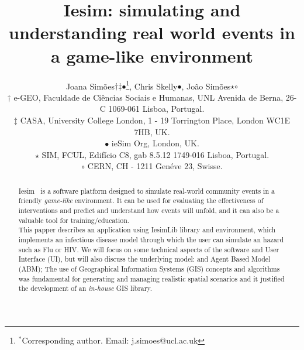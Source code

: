 \documentclass[printer]{tGIS2e}
\begin{document}

\title{Iesim: simulating and understanding real world events in a game-like environment}

\author{Joana Sim\~{o}es${\dag}$${\ddag}$${\bullet}$\thanks{$^\ast$Corresponding author. Email: j.simoes@ucl.ac.uk
\vspace{6pt}}, Chris Skelly${\bullet}$, Jo\~{a}o Sim\~{o}es${\star}$${\circ}$\\\vspace{6pt}  $\dag$ e-GEO, Faculdade de Ci\^{e}ncias Sociais e Humanas, UNL
Avenida de Berna, 26-C
1069-061 Lisboa,
Portugal.\\
$\ddag$ CASA,
 University College London,
 1 - 19 Torrington Place,
 London
 WC1E 7HB, UK.\\
$\bullet$ ieSim Org, London, UK.\\
$\star$ SIM, FCUL, Edif\'{i}cio C8, gab 8.5.12 1749-016 Lisboa, Portugal.\\
$\circ$  CERN, CH - 1211 Gen\'{e}ve 23, Swisse.\\
\vspace{6pt} }

\maketitle

\begin{abstract}
Iesim~\citep{iesim} is a software platform designed to simulate real-world community events in a friendly \textit{game-like} environment. It can be used for evaluating the effectiveness of interventions and predict and understand how events will unfold, and it can also be a valuable tool for training/education.\\
This papper describes an application using IesimLib library and environment, which implements an infectious disease model through which the user can simulate an hazard such as Flu or HIV. We will focus on some technical aspects of the software and User Interface (UI), but will also discuss the underlying model: and Agent Based Model (ABM); The use of Geographical Information Systems (GIS) concepts and algorithms was fundamental for generating and managing realistic spatial scenarios and it justified the development of an \textit{in-house} GIS library.
\end{abstract}
\bigskip
\end{document}
